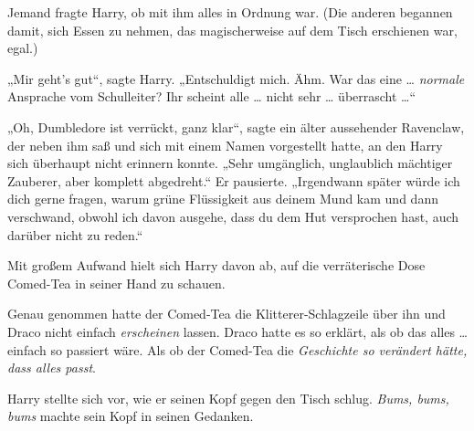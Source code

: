Jemand fragte Harry, ob mit ihm alles in Ordnung war. (Die anderen begannen damit, sich Essen zu nehmen, das magischerweise auf dem Tisch erschienen war, egal.)

„Mir geht’s gut“, sagte Harry.
„Entschuldigt mich. Ähm. War das eine … \emph{normale} Ansprache vom Schulleiter? Ihr scheint alle … nicht sehr … überrascht …“

„Oh, Dumbledore ist verrückt, ganz klar“, sagte ein älter aussehender Ravenclaw, der neben ihm saß und sich mit einem Namen vorgestellt hatte, an den Harry sich überhaupt nicht erinnern konnte.
„Sehr umgänglich, unglaublich mächtiger Zauberer, aber komplett abgedreht.“ Er pausierte.
„Irgendwann später würde ich dich gerne fragen, warum grüne Flüssigkeit aus deinem Mund kam und dann verschwand, obwohl ich davon ausgehe, dass du dem Hut versprochen hast, auch darüber nicht zu reden.“

Mit großem Aufwand hielt sich Harry davon ab, auf die verräterische Dose Comed-Tea in seiner Hand zu schauen.

Genau genommen hatte der Comed-Tea die Klitterer-Schlagzeile über ihn und Draco nicht einfach \emph{erscheinen} lassen. Draco hatte es so erklärt, als ob das alles … einfach so passiert wäre. Als ob der Comed-Tea die \emph{Geschichte so verändert hätte, dass alles passt}.

Harry stellte sich vor, wie er seinen Kopf gegen den Tisch schlug. \emph{Bums, bums, bums} machte sein Kopf in seinen Gedanken.

